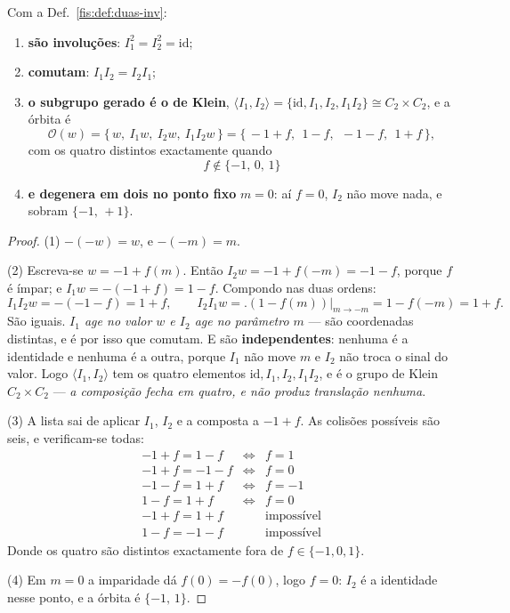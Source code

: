 \documentclass[livro.tex]{subfiles}
\begin{document}
\begin{teorema}\label{fis:thm:bidual}
Com a Def.~\ref{fis:def:duas-inv}:
\begin{enumerate}\itemsep3pt
\item[(1)] \textbf{são involuções}: $I_1^{2}=I_2^{2}=\mathrm{id}$;
\item[(2)] \textbf{comutam}: $I_1I_2=I_2I_1$;
\item[(3)] \textbf{o subgrupo gerado é o de Klein}, $\langle I_1,I_2\rangle
=\{\mathrm{id},I_1,I_2,I_1I_2\}\cong C_2\times C_2$, e a órbita é
\[
\mathcal{O}(w)=\{\,w,\ I_1w,\ I_2w,\ I_1I_2w\,\}
=\{\,-1+f,\ \ 1-f,\ \ -1-f,\ \ 1+f\,\},
\]
com os quatro distintos exactamente quando
\[
\boxed{\;f\notin\{-1,\,0,\,1\}\;}
\]
\item[(4)] \textbf{e degenera em dois no ponto fixo} $m=0$: aí $f=0$, $I_2$ não
move nada, e sobram $\{-1,\,+1\}$.
\end{enumerate}
\end{teorema}

\begin{proof}
(1) $-(-w)=w$, e $-(-m)=m$.

(2) Escreva-se $w=-1+f(m)$. Então $I_2w=-1+f(-m)=-1-f$, porque $f$ é ímpar; e
$I_1w=-(-1+f)=1-f$. Compondo nas duas ordens:
\[
I_1I_2w=-(-1-f)=1+f,
\qquad
I_2I_1w=\bigl.(1-f(m))\bigr|_{m\to-m}=1-f(-m)=1+f .
\]
São iguais. \emph{$I_1$ age no valor $w$ e $I_2$ age no parâmetro $m$} --- são
coordenadas distintas, e é por isso que comutam. E são \textbf{independentes}:
nenhuma é a identidade e nenhuma é a outra, porque $I_1$ não move $m$ e $I_2$
não troca o sinal do valor. Logo $\langle I_1,I_2\rangle$ tem os quatro
elementos $\mathrm{id},I_1,I_2,I_1I_2$, e é o grupo de Klein
$C_2\times C_2$ --- \emph{a composição fecha em quatro, e não produz translação
nenhuma}.

(3) A lista sai de aplicar $I_1$, $I_2$ e a composta a $-1+f$. As colisões
possíveis são seis, e verificam-se todas:
\[
\begin{array}{lll}
-1+f=1-f &\iff& f=1\\
-1+f=-1-f &\iff& f=0\\
-1-f=1+f &\iff& f=-1\\
1-f=1+f &\iff& f=0\\
-1+f=1+f & & \text{impossível}\\
1-f=-1-f & & \text{impossível}
\end{array}
\]
Donde os quatro são distintos exactamente fora de $f\in\{-1,0,1\}$.

(4) Em $m=0$ a imparidade dá $f(0)=-f(0)$, logo $f=0$: $I_2$ é a identidade nesse
ponto, e a órbita é $\{-1,\,1\}$.
\end{proof}
\end{document}
